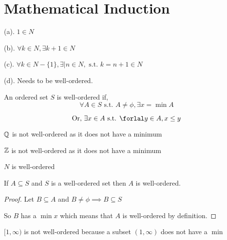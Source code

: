\chapter*{Mathematical Induction}
\setcounter{chapter}{8}

\begin{theorem}

    (a). $1 \in N$

    (b). $\forall k \in N, \exists k + 1 \in N$

    (c). $\forall k \in N - \{1\}, \exists | n \in N, \text { s.t. } k = n + 1 \in N$

    (d). Needs to be well-ordered.

\end{theorem}


An ordered set $S$ is well-ordered if, 
$$ \forall A \in S \text{ s.t. } A \ne \phi, \exists x = \min A $$ 

$$\text{Or, } \exists x \in A \text{ s.t. } \forlal y \in A, x \le y$$

\begin{eg}
    $\mathbb{Q}$ is not well-ordered as it does not have a minimum
\end{eg}

\begin{eg}
    $\mathbb{Z}$ is not well-ordered as it does not have a minimum
\end{eg}

\begin{axiom}
    $N$ is well-ordered 
\end{axiom}


\begin{theorem}
    If $A \subseteq S$ and $S$ is a well-ordered set then $A$ is well-ordered.
\end{theorem}
\begin{proof}
    Let $B \subseteq A$ and  $B \ne \phi \implies B \subseteq S$

    So $B$ has a $\min x$ which means that  $A$ is well-ordered by definition.
\end{proof}

\begin{eg}
    $[1,\infty)$ is not well-ordered because a subset  $(1,\infty)$ does not have a $\min$
\end{eg}


